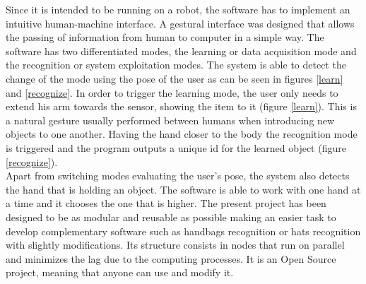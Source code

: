 Since it is intended to be running on a robot, the software has to implement an intuitive human-machine interface. 
A gestural interface was designed that allows the passing of information from human to computer in a simple way. 
The software has two differentiated modes, the learning or data acquisition mode and the recognition or system exploitation modes. 
The system is able to detect the change of the mode using the pose of the user as can be seen in figures \ref{learn} and \ref{recognize}. 
In order to trigger the learning mode, the user only needs to extend his arm towards the sensor, showing the item to it (figure \ref{learn}). 
This is a natural gesture usually performed between humans when introducing new objects to one another. 
Having the hand closer to the body the recognition mode is triggered and the program outputs a unique id for the learned object (figure \ref{recognize}). 
\\

Apart from switching modes evaluating the user's pose, the system also detects the hand that is holding an object. 
The software is able to work with one hand at a time and it chooses the one that is higher. 
The present project has been designed to be as modular and reusable as possible making an easier task to develop complementary software such as handbags recognition or hats recognition with slightly modifications. Its structure consists in nodes that run on parallel and minimizes the lag due to the computing processes. It is an Open Source project, meaning that anyone can use and modify it.

\newpage
	

